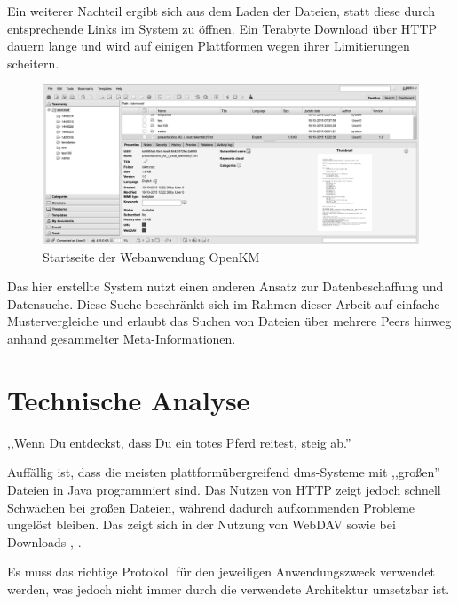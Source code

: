 \documentclass[oneside, ngerman, toc=bibliography,bibliography=totoc,listof=entryprefix, open=right,numbers=noenddot,fontsize=12pt]{scrbook}
\newcommand\chapmd[2]{\begin{mdframed}[%
		rightline=false,leftline=false,topline=false,bottomline=false,frametitlerule=false,
		userdefinedwidth=\textwidth,frametitlealignment=\flushright, %
		frametitlerulecolor=black,frametitle={\small #1}]
		\flushright{} \footnotesize{} #2
	\end{mdframed}}
\begin{document}
Ein weiterer Nachteil ergibt sich aus dem Laden der Dateien, statt diese durch entsprechende Links im System zu öffnen. Ein Terabyte Download über HTTP dauern lange und wird auf einigen Plattformen wegen ihrer Limitierungen scheitern. 

\begin{figure}[htbp] 
    \centering
    \includegraphics[width=\textwidth]{Masterarbeit_Bilder/openkm.png}
    \caption{Startseite der Webanwendung OpenKM}
    \label{openkm:home}
\end{figure}  


Das hier erstellte System nutzt einen anderen Ansatz zur Datenbeschaffung und Datensuche. Diese Suche beschränkt sich im Rahmen dieser Arbeit auf einfache Mustervergleiche und erlaubt das Suchen von Dateien über mehrere Peers hinweg anhand gesammelter Meta-Informationen. 




\chapter{Technische Analyse}
\label{chap:techAnal}
\chapmd{ Eine Weisheit der Dakota-Indianer}{,,Wenn Du entdeckst, dass Du ein totes Pferd reitest, steig ab.''}
 
Auffällig ist, dass die meisten plattformübergreifend \acrshort{dms}-Systeme mit ,,großen'' Dateien in Java programmiert sind. Das Nutzen von HTTP zeigt jedoch schnell Schwächen bei großen Dateien, während dadurch aufkommenden Probleme ungelöst bleiben. Das zeigt sich in der Nutzung von WebDAV sowie bei Downloads \cite{davlimit}, \cite{httplimit}.

Es muss das richtige Protokoll für den jeweiligen Anwendungszweck verwendet werden, was jedoch nicht immer durch die verwendete Architektur umsetzbar ist. 
\end{document}
